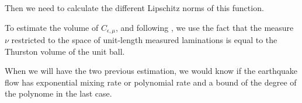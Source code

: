 Then we need to calculate the different Lipschitz norms of this function.

To estimate the volume of $C_{\epsilon,\mu}$, and following \cite{fu2015cusp}, we use the fact that the measure $\nu$ restricted to the space of unit-length measured laminations is equal to the Thurston volume of the unit ball.

When we will have the two previous estimation, we would know if the earthquake flow has exponential mixing rate or polynomial rate and a bound of the degree of the polynome in the last case.
